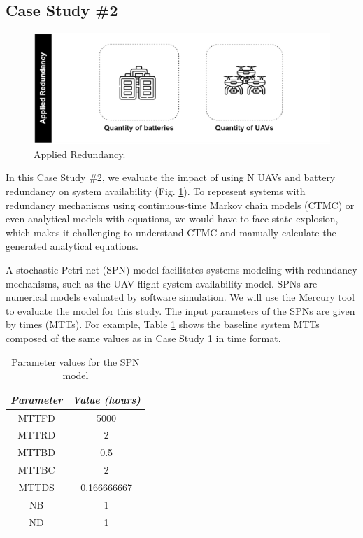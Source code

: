 \documentclass[conference]{IEEEtran}
\begin{document}
\subsection{Case Study \#2}
\label{sec:case_studies_sub02}

\begin{figure}[htbp]
\centerline{\includegraphics[scale=0.22]{img/operating_model_study_02.png}}
\caption{Applied Redundancy.}
\label{fig:case_study_02}
\end{figure}

In this Case Study \#2, we evaluate the impact of using N UAVs and battery redundancy on system availability (Fig. \ref{fig:case_study_02}). To represent systems with redundancy mechanisms using continuous-time Markov chain models (CTMC) or even analytical models with equations, we would have to face state explosion, which makes it challenging to understand CTMC and manually calculate the generated analytical equations.

A stochastic Petri net (SPN) model facilitates systems modeling with redundancy mechanisms, such as the UAV flight system availability model. SPNs are numerical models evaluated by software simulation. We will use the Mercury tool \citep{maciel2017mercury} to evaluate the model for this study. The input parameters of the SPNs are given by times (MTTs). For example, Table \ref{tab:basic_spn_parameter_values} shows the baseline system MTTs composed of the same values as in Case Study 1 in time format.

\begin{table}[htbp]
\caption{Parameter values for the SPN model}
\begin{center}
\begin{tabular}{c|c}
\hline
\textbf{\textit{Parameter}} & \textbf{\textit{Value (hours)}} \\
\hline
\hline
 MTTFD & 5000\\
 MTTRD & 2\\
 MTTBD & 0.5 \\ 
 MTTBC & 2 \\
 MTTDS & 0.166666667 \\
 NB & 1 \\
 ND & 1 \\
\hline
\end{tabular}
\label{tab:basic_spn_parameter_values}
\end{center}
\end{table}
\end{document}
